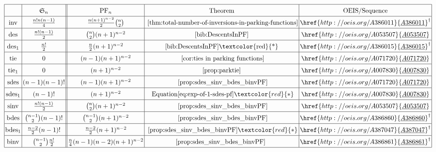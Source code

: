 \documentclass{amsart}
\newcommand{\seqnum}[1]{\href{http://oeis.org/#1}{\underline{#1}}}
\newcommand{\red}[1]{\textcolor{red}{#1}}
\renewcommand{\S}{\mathfrak{S}}
\DeclareMathOperator{\des}{des}
\DeclareMathOperator{\inv}{inv}
\DeclareMathOperator{\sinv}{sinv}
\DeclareMathOperator{\sdes}{sdes}
\DeclareMathOperator{\bdes}{bdes}
\DeclareMathOperator{\binv}{binv}
\DeclareMathOperator{\tie}{tie}
\DeclareMathOperator{\PF}{PF}
\theoremstyle{definition}
\begin{document}
\begin{table}[h]
\[\arraycolsep=1.4pt\def\arraystretch{1.5}
\begin{array}{|c|c||c|c|c|}\hline
    &\S_n&\PF_n& \mbox{ Theorem } &\mbox{ OEIS/Sequence }\\\hline
        \inv&\frac{n!n(n-1)}{4}&\frac{n(n+1)^{n-2}}{2}\binom{n}{2}& \mbox{ \Cref{thm:total-number-of-inversions-in-parking-functions}} & \seqnum{A386011}^{\text{\textdagger}}
        \\\hline
    \des&\frac{n!(n-1)}{2}&\binom{n}{2}(n+1)^{n-2}& \text{\cite[Theorem 10]{bib:DescentsInPF}} &
    \seqnum{A053507}
    \\\hline
    \des_1&\frac{n!}{2}&\frac{n}{2}(n+1)^{n-2}& 
    \text{\cite[Theorem 10]{bib:DescentsInPF}\red{*}}
    & \seqnum{A386015}^{\text{\textdagger}}
    \\\hline
    \tie&0&(n-1)(n+1)^{n-2}& \mbox{ \Cref{cor:ties in parking functions}} &\seqnum{A071720}\\\hline
    \tie_1&0&(n+1)^{n-2}& \mbox{\Cref{prop:parktie}} &  \seqnum{A007830}\\\hline
    \sdes&(n-1)(n-1)!&(n-1)(n+1)^{n-2}&  \mbox{ \Cref{prop:sdes_sinv_bdes_binvPF}}  & \seqnum{A071720}\\\hline
    \sdes_1&(n-1)!&(n+1)^{n-2}& \mbox{ Equation} \eqref{eq:exp-of-1-sdes-pf}\red{*}  & \seqnum{A007830}\\\hline
    \sinv&\frac{n!(n-1)}{2}&\binom{n}{2}(n+1)^{n-2}&  \mbox{ \Cref{prop:sdes_sinv_bdes_binvPF}} & \seqnum{A053507}  \\\hline
    \bdes&\binom{n-1}{2}(n-1)!&\binom{n-1}{2}(n+1)^{n-2}&  \mbox{ \Cref{prop:sdes_sinv_bdes_binvPF}} & \seqnum{A386860}^{\text{\textdagger}}\\\hline
    \bdes_1&\frac{n-2}{2}(n-1)!&\frac{n-2}{2}(n+1)^{n-2}&  \mbox{ \Cref{prop:sdes_sinv_bdes_binvPF}}\red{*}& \seqnum{A387047}^{\text{\textdagger}} \\\hline
    \binv&\binom{n-1}{2}\frac{n!}{2}& \frac{n}{4}(n-1)(n-2)(n+1)^{n-2}&  \mbox{\Cref{prop:sdes_sinv_bdes_binvPF} } & \seqnum{A386861}^{\text{\textdagger}}\\\hline
\end{array}\]
   \caption{Totals of certain statistics over $\S_n$ and $\PF_n$. The references to theorems and OEIS entries given refer to the results for parking functions in particular. The analogous results for the symmetric group are classical (e.g.\cite{Stern_1838, Terquem1838}), except those involving sdes and those listed in the rows below it, which are given by . The references marked with (\red{*}), are the result of applying  to the statistics indicated. OEIS entries that were added as a result of this project are marked with (\text{\textdagger}). 
   For any OEIS entry which is unmarked, except those for descents, our project contributes a new combinatorial perspective in terms of parking functions.}
    \label{tab:stats-on-sn-and-pf} 
\end{table}
\end{document}
